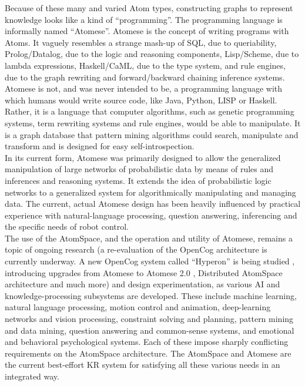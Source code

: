 Because of these many and varied Atom types, constructing graphs to represent knowledge looks like a kind of \enquote{programming}. 
The programming language is informally named \enquote{Atomese}. 
Atomese is the concept of writing programs with Atoms. 
It vaguely resembles a strange mash-up of SQL, due to queriability, Prolog/Datalog, due to the logic and reasoning components, Lisp/Scheme, due to lambda expressions, Haskell/CaML, due to the type system, and rule engines, due to the graph rewriting and forward/backward chaining inference systems. \\
Atomese is not, and was never intended to be, a programming language with which humans would write source code, like Java, Python, LISP or Haskell. 
Rather, it is a language that computer algorithms, such as genetic programming systems, term rewriting systems and rule engines, would be able to manipulate. 
It is a graph database that pattern mining algorithms could search, manipulate and transform and is designed for easy self-introspection. \\
In its current form, Atomese was primarily designed to allow the generalized manipulation of large networks of probabilistic data by means of rules and inferences and reasoning systems. It extends the idea of probabilistic logic networks to a generalized system for algorithmically manipulating and managing data. The current, actual Atomese design has been heavily influenced by practical experience with natural-language processing, question answering, inferencing and the specific needs of robot control. \\

The use of the AtomSpace, and the operation and utility of Atomese, remains a topic of ongoing research (a re-evaluation of the OpenCog architecture is currently underway. A new OpenCog system called \enquote{Hyperon} is being studied \cite{goertzel_potapov_senna_singularitynet-opencog_team_2020}, introducing upgrades from Atomese to Atomese 2.0 \cite{DBLP:journals/corr/abs-2004-05267}, Distributed AtomSpace architecture \cite{distributed_2017, senna_2018, potapov_2020_1, potapov_2020_2} and much more) and design experimentation, as various AI and knowledge-processing subsystems are developed. These include machine learning, natural language processing, motion control and animation, deep-learning networks and vision processing, constraint solving and planning, pattern mining and data mining, question answering and common-sense systems, and emotional and behavioral psychological systems. Each of these impose sharply conflicting requirements on the AtomSpace architecture. The AtomSpace and Atomese are the current best-effort KR system for satisfying all these various needs in an integrated way.


